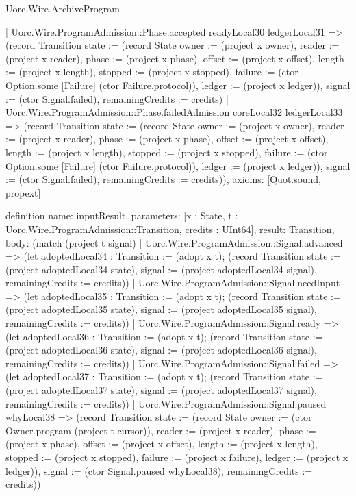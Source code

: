 \begin{lexlean}{Uorc.Wire.ArchiveProgram}
\begin{semanticmodule}
{    | Uorc.Wire.ProgramAdmission::Phase.accepted readyLocal30 ledgerLocal31 => (record Transition {state := (record State {owner := (project x owner), reader := (project x reader), phase := (project x phase), offset := (project x offset), length := (project x length), stopped := (project x stopped), failure := (ctor Option.some [Failure] (ctor Failure.protocol)), ledger := (project x ledger)}), signal := (ctor Signal.failed), remainingCredits := credits})
    | Uorc.Wire.ProgramAdmission::Phase.failedAdmission coreLocal32 ledgerLocal33 => (record Transition {state := (record State {owner := (project x owner), reader := (project x reader), phase := (project x phase), offset := (project x offset), length := (project x length), stopped := (project x stopped), failure := (ctor Option.some [Failure] (ctor Failure.protocol)), ledger := (project x ledger)}), signal := (ctor Signal.failed), remainingCredits := credits})),
  axioms: [Quot.sound, propext]
}

definition{
  name: inputResult,
  parameters: [x : State, t : Uorc.Wire.ProgramAdmission::Transition, credits : UInt64],
  result: Transition,
  body: (match (project t signal)
    | Uorc.Wire.ProgramAdmission::Signal.advanced => (let adoptedLocal34 : Transition := (adopt x t); (record Transition {state := (project adoptedLocal34 state), signal := (project adoptedLocal34 signal), remainingCredits := credits}))
    | Uorc.Wire.ProgramAdmission::Signal.needInput => (let adoptedLocal35 : Transition := (adopt x t); (record Transition {state := (project adoptedLocal35 state), signal := (project adoptedLocal35 signal), remainingCredits := credits}))
    | Uorc.Wire.ProgramAdmission::Signal.ready => (let adoptedLocal36 : Transition := (adopt x t); (record Transition {state := (project adoptedLocal36 state), signal := (project adoptedLocal36 signal), remainingCredits := credits}))
    | Uorc.Wire.ProgramAdmission::Signal.failed => (let adoptedLocal37 : Transition := (adopt x t); (record Transition {state := (project adoptedLocal37 state), signal := (project adoptedLocal37 signal), remainingCredits := credits}))
    | Uorc.Wire.ProgramAdmission::Signal.paused whyLocal38 => (record Transition {state := (record State {owner := (ctor Owner.program (project t cursor)), reader := (project x reader), phase := (project x phase), offset := (project x offset), length := (project x length), stopped := (project x stopped), failure := (project x failure), ledger := (project x ledger)}), signal := (ctor Signal.paused whyLocal38), remainingCredits := credits}))
}


\end{semanticmodule}
\end{lexlean}
